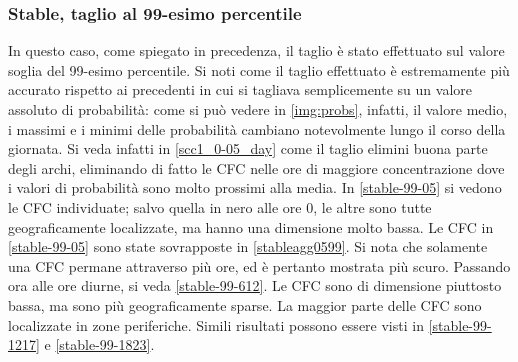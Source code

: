 \documentclass[10pt,a4paper]{article}
\begin{document}
\subsubsection{Stable, taglio al 99-esimo percentile}
\label{stable3}
In questo caso, come spiegato in precedenza, il taglio è stato effettuato sul valore soglia del 99-esimo percentile. Si noti come il taglio effettuato è estremamente più accurato rispetto ai precedenti in cui si tagliava semplicemente su un valore assoluto di probabilità: come si può vedere in \ref{img:probs}, infatti, il valore medio, i massimi e i minimi delle probabilità cambiano notevolmente lungo il corso della giornata. 
Si veda infatti in \ref{scc1_0-05_day} come il taglio elimini buona parte degli archi, eliminando di fatto le CFC nelle ore di maggiore concentrazione dove i valori di probabilità sono molto prossimi alla media. 
In \ref{stable-99-05} si vedono le CFC individuate; salvo quella in nero alle ore 0, le altre sono tutte geograficamente localizzate, ma hanno una dimensione molto bassa. Le CFC in \ref{stable-99-05} sono state sovrapposte in \ref{stableagg0599}. Si nota che solamente una CFC permane attraverso più ore, ed è pertanto mostrata più scuro. 
Passando ora alle ore diurne, si veda \ref{stable-99-612}. Le CFC sono di dimensione piuttosto bassa, ma sono più geograficamente sparse. La maggior parte delle CFC sono localizzate in zone periferiche.
Simili risultati possono essere visti in \ref{stable-99-1217} e \ref{stable-99-1823}. 
\end{document}

